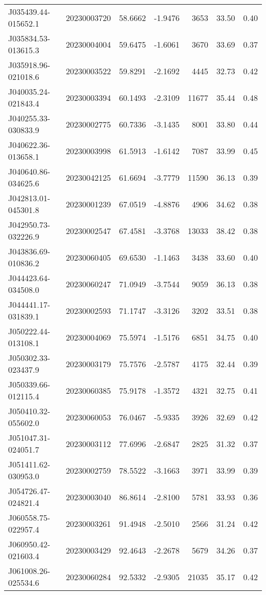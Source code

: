 \documentclass{article}
\begin{document}
\begin {longtable}{|l|l|r|r|r|r|r|}
 J035439.44-015652.1&  20230003720&   58.6662&   -1.9476&  3653& 33.50& 0.40\\
 J035834.53-013615.3&  20230004004&   59.6475&   -1.6061&  3670& 33.69& 0.37\\
 J035918.96-021018.6&  20230003522&   59.8291&   -2.1692&  4445& 32.73& 0.42\\
 J040035.24-021843.4&  20230003394&   60.1493&   -2.3109& 11677& 35.44& 0.48\\
 J040255.33-030833.9&  20230002775&   60.7336&   -3.1435&  8001& 33.80& 0.44\\
 J040622.36-013658.1&  20230003998&   61.5913&   -1.6142&  7087& 33.99& 0.45\\
 J040640.86-034625.6&  20230042125&   61.6694&   -3.7779& 11590& 36.13& 0.39\\
 J042813.01-045301.8&  20230001239&   67.0519&   -4.8876&  4906& 34.62& 0.38\\
 J042950.73-032226.9&  20230002547&   67.4581&   -3.3768& 13033& 38.42& 0.38\\
 J043836.69-010836.2&  20230060405&   69.6530&   -1.1463&  3438& 33.60& 0.40\\
 J044423.64-034508.0&  20230060247&   71.0949&   -3.7544&  9059& 36.13& 0.38\\
 J044441.17-031839.1&  20230002593&   71.1747&   -3.3126&  3202& 33.51& 0.38\\
 J050222.44-013108.1&  20230004069&   75.5974&   -1.5176&  6851& 34.75& 0.40\\
 J050302.33-023437.9&  20230003179&   75.7576&   -2.5787&  4175& 32.44& 0.39\\
 J050339.66-012115.4&  20230060385&   75.9178&   -1.3572&  4321& 32.75& 0.41\\
 J050410.32-055602.0&  20230060053&   76.0467&   -5.9335&  3926& 32.69& 0.42\\
 J051047.31-024051.7&  20230003112&   77.6996&   -2.6847&  2825& 31.32& 0.37\\
 J051411.62-030953.0&  20230002759&   78.5522&   -3.1663&  3971& 33.99& 0.39\\
 J054726.47-024821.4&  20230003040&   86.8614&   -2.8100&  5781& 33.93& 0.36\\
 J060558.75-022957.4&  20230003261&   91.4948&   -2.5010&  2566& 31.24& 0.42\\
 J060950.42-021603.4&  20230003429&   92.4643&   -2.2678&  5679& 34.26& 0.37\\
 J061008.26-025534.6&  20230060284&   92.5332&   -2.9305& 21035& 35.17& 0.42\\

\end{longtable}
\end{document}
